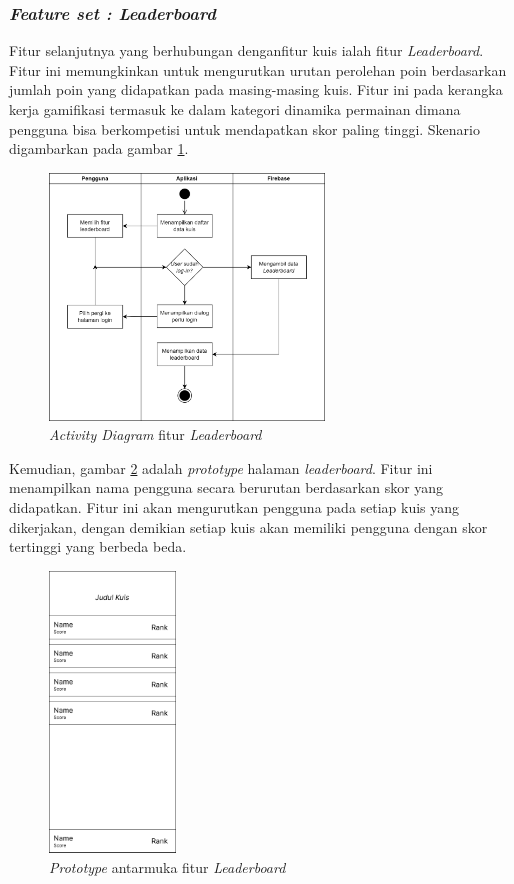 \subsubsection{\textit{Feature set : Leaderboard}}
Fitur selanjutnya yang berhubungan denganfitur kuis ialah fitur \textit{Leaderboard}. 
Fitur ini memungkinkan untuk mengurutkan urutan perolehan poin berdasarkan jumlah poin yang didapatkan pada masing-masing kuis.
Fitur ini pada kerangka kerja gamifikasi termasuk ke dalam kategori dinamika permainan dimana pengguna bisa berkompetisi untuk mendapatkan skor paling tinggi.
Skenario digambarkan pada gambar \ref*{Fig:ActivityLeaderboard}.
\begin{figure}[H]
	\centering
	\includegraphics[width=0.65\textwidth]{contents/chapter-3/images/AD-leaderboard.png}
	\caption{\textit{Activity Diagram} fitur \textit{Leaderboard}}
	\label{Fig:ActivityLeaderboard}
\end{figure}
Kemudian, gambar \ref*{Fig:ActivityLeaderboard2} adalah \textit{prototype} halaman \textit{leaderboard}.
Fitur ini menampilkan nama pengguna secara berurutan berdasarkan skor yang didapatkan.
Fitur ini akan mengurutkan pengguna pada setiap kuis yang dikerjakan, dengan demikian setiap kuis akan memiliki pengguna dengan skor tertinggi yang berbeda beda.
\begin{figure}[H]
	\centering
	\includegraphics[width=0.3\textwidth]{contents/chapter-3/images/MF-leaderboard.png}
	\caption{\textit{Prototype} antarmuka fitur \textit{Leaderboard}}
	\label{Fig:ActivityLeaderboard2}
\end{figure}
